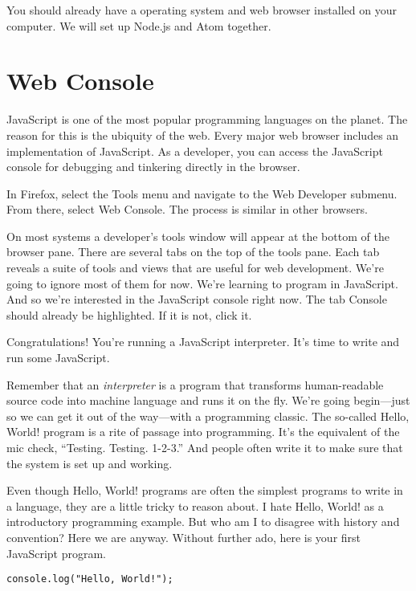 You should already have a operating system and web browser installed on your computer. We will set up Node.js and Atom together.

\section{Web Console}
JavaScript is one of the most popular programming languages on the planet. The reason for this is the ubiquity of the web. Every major web browser includes an implementation of JavaScript. As a developer, you can access the JavaScript console for debugging and tinkering directly in the browser.

In Firefox, select the \textsf{Tools} menu and navigate to the \textsf{Web Developer} submenu. From there, select \textsf{Web Console}. The process is similar in other browsers.

On most systems a developer's tools window will appear at the bottom of the browser pane. There are several tabs on the top of the tools pane. Each tab reveals a suite of tools and views that are useful for web development. We're going to ignore most of them for now. We're learning to program in JavaScript. And so we're interested in the JavaScript console right now. The tab \textsf{Console} should already be highlighted. If it is not, click it.

Congratulations! You're running a JavaScript interpreter. It's time to write and run some JavaScript.

Remember that an \emph{interpreter} is a program that transforms human-readable source code into machine language and runs it on the fly. We're going begin---just so we can get it out of the way---with a programming classic. The so-called \textsf{Hello, World!} program is a rite of passage into programming. It's the equivalent of the mic check, ``Testing. Testing. 1-2-3.'' And people often write it to make sure that the system is set up and working.

Even though Hello, World! programs are often the simplest programs to write in a language, they are a little tricky to reason about. I hate Hello, World! as a introductory programming example. But who am I to disagree with history and convention? Here we are anyway. Without further ado, here is your first JavaScript program.

\suppresslinenumbers
\begin{lstlisting}[caption={\label{listing:intro-hello}Hello, World! It's good to see you.}]
console.log("Hello, World!");
\end{lstlisting}

